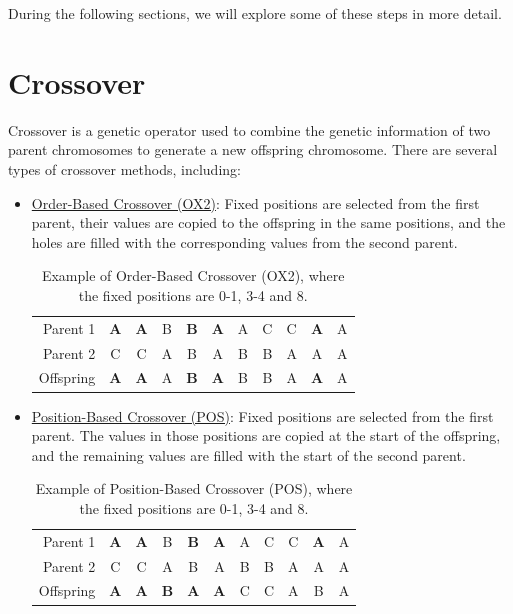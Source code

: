 During the following sections, we will explore some of these steps in more detail.

\section{Crossover}
Crossover is a genetic operator used to combine the genetic information of two parent chromosomes to generate a new offspring chromosome. There are several types of crossover methods, including:
\begin{itemize}
    \item \ul{Order-Based Crossover (OX2)}:
    Fixed positions are selected from the first parent, their values are copied to the offspring in the same positions,
    and the holes are filled with the corresponding values from the second parent.
    \begin{table}[ht]
        \centering
        \begin{tabular}{r|cccccccccc}
            Parent 1 & \textbf{A} & \textbf{A} & B & \textbf{B} & \textbf{A} & A & C & C & \textbf{A} & A \\
            Parent 2 & C & C & A & B & A & B & B & A & A & A \\ \hline
            Offspring & \textbf{A} & \textbf{A} & A & \textbf{B} & \textbf{A} & B & B & A & \textbf{A} & A
        \end{tabular}
        \caption{\centering Example of Order-Based Crossover (OX2), where the fixed positions are 0-1, 3-4 and 8.}
    \end{table}
    \item \ul{Position-Based Crossover (POS)}:
    Fixed positions are selected from the first parent. The values in those positions are copied at the start of the offspring, and the remaining values are filled with the start of the second parent.
    \begin{table}[ht]
        \centering
        \begin{tabular}{r|cccccccccc}
            Parent 1 & \textbf{A} & \textbf{A} & B & \textbf{B} & \textbf{A} & A & C & C & \textbf{A} & A \\
            Parent 2 & C & C & A & B & A & B & B & A & A & A \\ \hline
            Offspring & \textbf{A} & \textbf{A} & \textbf{B} & \textbf{A} & \textbf{A} & C & C & A & B & A
        \end{tabular}
        \caption{\centering Example of Position-Based Crossover (POS), where the fixed positions are 0-1, 3-4 and 8.}
    \end{table}


\end{itemize}
